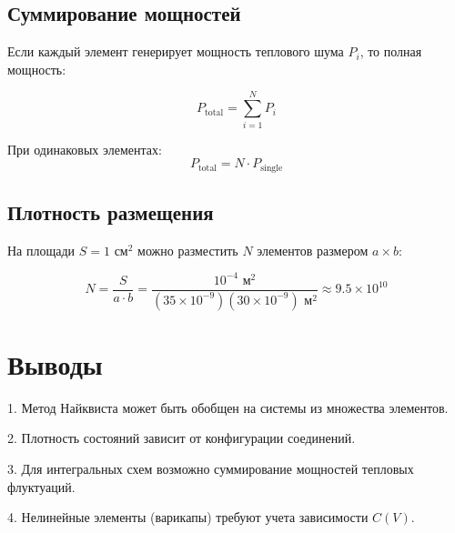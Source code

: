 \documentclass[12pt,a4paper]{article}
\begin{document}
\subsection{Суммирование мощностей}

Если каждый элемент генерирует мощность теплового шума $P_i$, то полная мощность:

\begin{equation}
P_{\text{total}} = \sum_{i=1}^{N} P_i
\end{equation}

При одинаковых элементах:
\begin{equation}
P_{\text{total}} = N \cdot P_{\text{single}}
\end{equation}

\subsection{Плотность размещения}

На площади $S = 1 \text{ см}^2$ можно разместить $N$ элементов размером $a \times b$:

\begin{equation}
N = \frac{S}{a \cdot b} = \frac{10^{-4} \text{ м}^2}{(35 \times 10^{-9})(30 \times 10^{-9}) \text{ м}^2} \approx 9.5 \times 10^{10}
\end{equation}

\section{Выводы}

1. Метод Найквиста может быть обобщен на системы из множества элементов.

2. Плотность состояний зависит от конфигурации соединений.

3. Для интегральных схем возможно суммирование мощностей тепловых флуктуаций.

4. Нелинейные элементы (варикапы) требуют учета зависимости $C(V)$.
\end{document}
